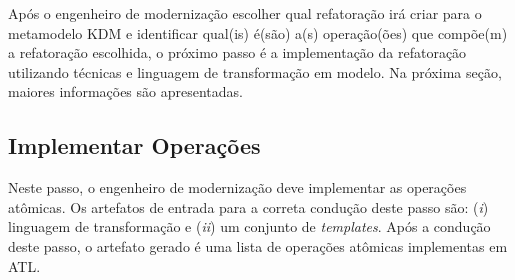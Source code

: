 Após o engenheiro de modernização escolher qual refatoração irá criar para o metamodelo KDM e identificar qual(is) é(são) a(s) operação(ões) que compõe(m) a refatoração escolhida, o próximo passo é a implementação da refatoração utilizando técnicas e linguagem de transformação em modelo. Na próxima seção, maiores informações são apresentadas.

\subsection{Implementar Operações}\label{sec:linguagemDeTransformacaoUtilizada}




Neste passo, o engenheiro de modernização deve implementar as operações atômicas. Os artefatos de entrada para a correta condução deste passo são: (\textit{i}) linguagem de transformação e (\textit{ii}) um conjunto de \textit{templates}. Após a condução deste passo, o artefato gerado é uma lista de operações atômicas implementas em ATL. 

